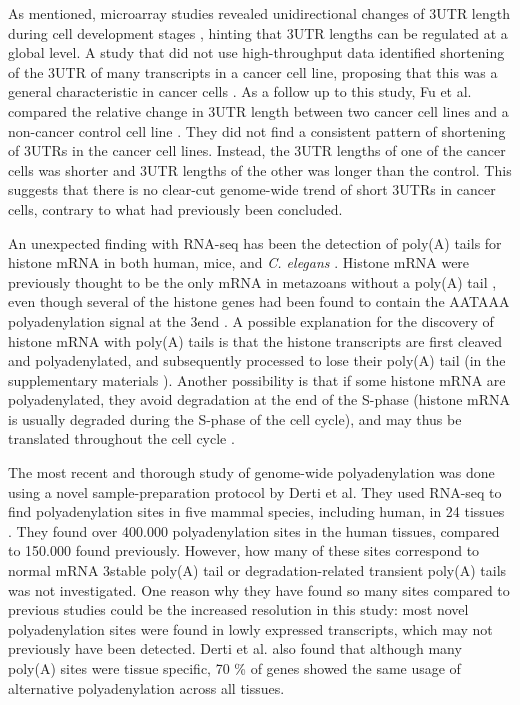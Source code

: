 As mentioned, microarray studies revealed unidirectional changes of 3\p UTR
length during cell development stages \cite{sandberg_proliferating_2008,
ji_progressive_2009}, hinting that 3\p UTR lengths can be regulated at a global
level. A study that did not use high-throughput data identified shortening of
the 3\p UTR of many transcripts in a cancer cell line, proposing that this was
a general characteristic in cancer cells \cite{mayr_widespread_2009-2}. As a
follow up to this study, Fu et al. compared the relative change in 3\p UTR
length between two cancer cell lines and a non-cancer control cell line
\cite{fu_differential_2011}. They did not find a consistent pattern of
shortening of 3\p UTRs in the cancer cell lines. Instead, the 3\p UTR lengths
of one of the cancer cells was shorter and 3\p UTR lengths of the other was
longer than the control. This suggests that there is no clear-cut genome-wide
trend of short 3\p UTRs in cancer cells, contrary to what had previously been
concluded.

An unexpected finding with RNA-seq has been the detection of poly(A) tails for
histone mRNA in both human, mice, and \textit{C. elegans}
\cite{mangone_landscape_2010-1, shepard_complex_2011}.  Histone mRNA were
previously thought to be the only mRNA in metazoans without a poly(A) tail
\cite{marzluff_metabolism_2008}, even though several of the histone genes had
been found to contain the AATAAA polyadenylation signal at the 3\p end
\cite{keall_histone_2007}. A possible explanation for the discovery of histone
mRNA with poly(A) tails is that the histone transcripts are first cleaved and
polyadenylated, and subsequently processed to lose their poly(A) tail
\cite{mangone_landscape_2010-1} (in the supplementary materials
\cite{mangone_landscape_2010-1}). Another possibility is that if some histone
mRNA are polyadenylated, they avoid degradation at the end of the S-phase
(histone mRNA is usually degraded during the S-phase of the cell cycle), and
may thus be translated throughout the cell cycle \cite{shepard_complex_2011}.

The most recent and thorough study of genome-wide polyadenylation was done
using a novel sample-preparation protocol by Derti et al. They used RNA-seq to
find polyadenylation sites in five mammal species, including human, in 24
tissues \cite{derti_quantitative_2012}. They found over 400.000 polyadenylation
sites in the human tissues, compared to 150.000 found previously. However, how
many of these sites correspond to normal mRNA 3\p stable poly(A) tail or
degradation-related transient poly(A) tails was not investigated. One reason
why they have found so many sites compared to previous studies could be the
increased resolution in this study: most novel polyadenylation sites were found
in lowly expressed transcripts, which may not previously have been detected.
Derti et al. also found that although many poly(A) sites were tissue specific,
70 \% of genes showed the same usage of alternative polyadenylation across all
tissues.
